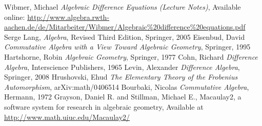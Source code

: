 \begin{thebibliography}{9}
 Wibmer, Michael \emph{Algebraic Difference Equations (Lecture Notes)}, Available online: \url{http://www.algebra.rwth-aachen.de/de/Mitarbeiter/Wibmer/Algebraic\%20difference\%20equations.pdf}
 Serge Lang, \emph{Algebra}, Revised Third Edition, Springer, 2005
 Eisenbud, David \emph{Commutative Algebra with a View Toward Algebraic Geometry}, Springer, 1995
 Hartshorne, Robin \emph{Algebraic Geometry}, Springer, 1977
 Cohn,  Richard \emph{Difference Algebra}, Interscience Publishers, 1965
 Levin, Alexander \emph{Difference Algebra}, Springer, 2008
 Hrushovski, Ehud \emph{The Elementary Theory of the Frobenius Automorphism}, arXiv:math/0406514 
 Bourbaki, Nicolas \emph{Commutative Algebra}, Hermann, 1972
 Grayson, Daniel R. and Stillman, Michael E., Macaulay2, a software system for research in algebraic geometry, Available at \href{http://www.math.uiuc.edu/Macaulay2/}{http://www.math.uiuc.edu/Macaulay2/}
\end{thebibliography}
